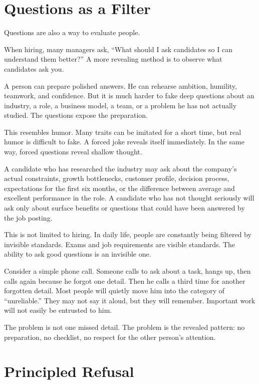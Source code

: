 \section*{Questions as a Filter}

Questions are also a way to evaluate people.

When hiring, many managers ask, ``What should I ask candidates so I can understand them better?'' A more revealing method is to observe what candidates ask you.

A person can prepare polished answers. He can rehearse ambition, humility, teamwork, and confidence. But it is much harder to fake deep questions about an industry, a role, a business model, a team, or a problem he has not actually studied. The questions expose the preparation.

This resembles humor. Many traits can be imitated for a short time, but real humor is difficult to fake. A forced joke reveals itself immediately. In the same way, forced questions reveal shallow thought.

A candidate who has researched the industry may ask about the company's actual constraints, growth bottlenecks, customer profile, decision process, expectations for the first six months, or the difference between average and excellent performance in the role. A candidate who has not thought seriously will ask only about surface benefits or questions that could have been answered by the job posting.

This is not limited to hiring. In daily life, people are constantly being filtered by invisible standards. Exams and job requirements are visible standards. The ability to ask good questions is an invisible one.

Consider a simple phone call. Someone calls to ask about a task, hangs up, then calls again because he forgot one detail. Then he calls a third time for another forgotten detail. Most people will quietly move him into the category of ``unreliable.'' They may not say it aloud, but they will remember. Important work will not easily be entrusted to him.

The problem is not one missed detail. The problem is the revealed pattern: no preparation, no checklist, no respect for the other person's attention.

\section*{Principled Refusal}

